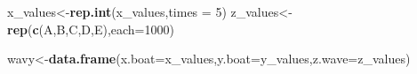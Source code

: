 \documentclass[
]{article}
\newenvironment{Shaded}{\begin{snugshade}}{\end{snugshade}}
\newcommand{\AttributeTok}[1]{\textcolor[rgb]{0.13,0.29,0.53}{#1}}
\newcommand{\DecValTok}[1]{\textcolor[rgb]{0.00,0.00,0.81}{#1}}
\newcommand{\FunctionTok}[1]{\textcolor[rgb]{0.13,0.29,0.53}{\textbf{#1}}}
\newcommand{\NormalTok}[1]{#1}
\newcommand{\OtherTok}[1]{\textcolor[rgb]{0.56,0.35,0.01}{#1}}
\newcommand{\StringTok}[1]{\textcolor[rgb]{0.31,0.60,0.02}{#1}}
\begin{document}
\begin{Shaded}
\begin{Highlighting}[]
\NormalTok{x\_values}\OtherTok{\textless{}{-}}\FunctionTok{rep.int}\NormalTok{(x\_values,}\AttributeTok{times =} \DecValTok{5}\NormalTok{)}
\NormalTok{z\_values}\OtherTok{\textless{}{-}}\FunctionTok{rep}\NormalTok{(}\FunctionTok{c}\NormalTok{(}\StringTok{\textquotesingle{}A\textquotesingle{}}\NormalTok{,}\StringTok{\textquotesingle{}B\textquotesingle{}}\NormalTok{,}\StringTok{\textquotesingle{}C\textquotesingle{}}\NormalTok{,}\StringTok{\textquotesingle{}D\textquotesingle{}}\NormalTok{,}\StringTok{\textquotesingle{}E\textquotesingle{}}\NormalTok{),}\AttributeTok{each=}\DecValTok{1000}\NormalTok{)}

\NormalTok{ wavy}\OtherTok{\textless{}{-}}\FunctionTok{data.frame}\NormalTok{(}\AttributeTok{x.boat=}\NormalTok{x\_values,}\AttributeTok{y.boat=}\NormalTok{y\_values,}\AttributeTok{z.wave=}\NormalTok{z\_values)}





\end{Highlighting}
\end{Shaded}
\end{document}
